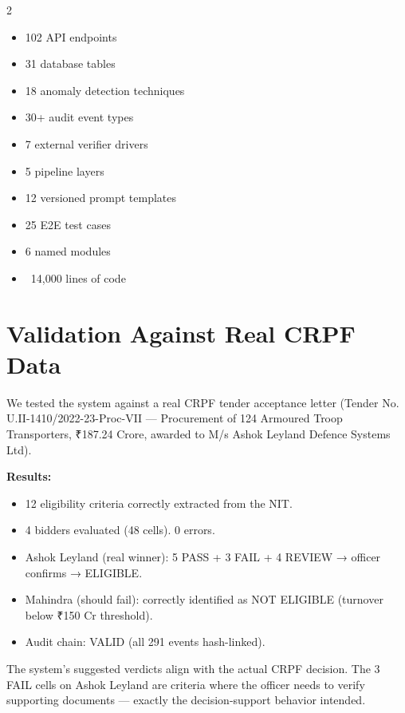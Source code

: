 \documentclass[11pt,a4paper]{article}
\begin{document}
\begin{multicols}{2}
\begin{itemize}[nosep]
    \item 102 API endpoints
    \item 31 database tables
    \item 18 anomaly detection techniques
    \item 30+ audit event types
    \item 7 external verifier drivers
    \item 5 pipeline layers
    \item 12 versioned prompt templates
    \item 25 E2E test cases
    \item 6 named modules
    \item ~14,000 lines of code
\end{itemize}
\end{multicols}

\section{Validation Against Real CRPF Data}

We tested the system against a real CRPF tender acceptance letter (Tender No. U.II-1410/2022-23-Proc-VII — Procurement of 124 Armoured Troop Transporters, ₹187.24 Crore, awarded to M/s Ashok Leyland Defence Systems Ltd).

\textbf{Results:}
\begin{itemize}[nosep]
    \item 12 eligibility criteria correctly extracted from the NIT.
    \item 4 bidders evaluated (48 cells). 0 errors.
    \item Ashok Leyland (real winner): 5 PASS + 3 FAIL + 4 REVIEW → officer confirms → ELIGIBLE.
    \item Mahindra (should fail): correctly identified as NOT ELIGIBLE (turnover below ₹150 Cr threshold).
    \item Audit chain: VALID (all 291 events hash-linked).
\end{itemize}

The system's suggested verdicts align with the actual CRPF decision. The 3 FAIL cells on Ashok Leyland are criteria where the officer needs to verify supporting documents — exactly the decision-support behavior intended.
\end{document}
